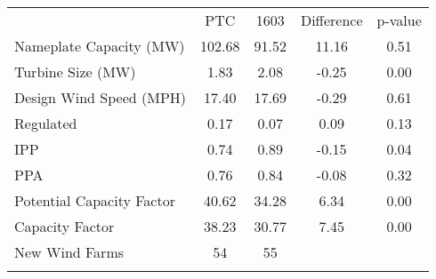 \begin{center}
\begin{tabular}{lcccc}
\hline \noalign{\smallskip} & PTC & 1603 & Difference & p-value\\
\noalign{\smallskip}\hline Nameplate Capacity (MW) & 102.68 & 91.52 & 11.16 & 0.51\\
Turbine Size (MW) & 1.83 & 2.08 & -0.25 & 0.00\\
Design Wind Speed (MPH) & 17.40 & 17.69 & -0.29 & 0.61\\
Regulated & 0.17 & 0.07 & 0.09 & 0.13\\
IPP & 0.74 & 0.89 & -0.15 & 0.04\\
PPA & 0.76 & 0.84 & -0.08 & 0.32\\
Potential Capacity Factor & 40.62 & 34.28 & 6.34 & 0.00\\
Capacity Factor & 38.23 & 30.77 & 7.45 & 0.00\\
\hline \noalign{\smallskip}New Wind Farms & 54 & 55 &  & \\
\noalign{\smallskip}\hline\end{tabular}\\
\end{center}
